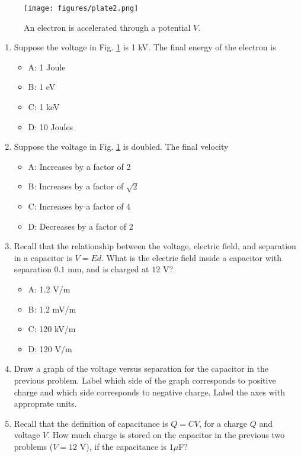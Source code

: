 \documentclass[10pt]{article}
\begin{document}
\begin{enumerate}
\begin{figure}[hb]
\centering
\texttt{[image: figures/plate2.png]}
\caption{\label{fig:plate2} An electron is accelerated through a potential $V$.}
\end{figure}
\begin{enumerate}
\item Suppose the voltage in Fig. \ref{fig:plate2} is 1 kV.  The final energy of the electron is
\begin{itemize}
\item A: 1 Joule
\item B: 1 eV
\item C: 1 keV
\item D: 10 Joules
\end{itemize}
\item Suppose the voltage in Fig. \ref{fig:plate2} is doubled.  The final velocity
\begin{itemize}
\item A: Increases by a factor of 2
\item B: Increases by a factor of $\sqrt{2}$
\item C: Increases by a factor of 4
\item D: Decreases by a factor of 2
\end{itemize}
\item Recall that the relationship between the voltage, electric field, and separation in a capacitor is $V = E d$.  What is the electric field inside a capacitor with separation $0.1$ mm, and is charged at $12$ V?
\begin{itemize}
\item A: 1.2 V/m
\item B: 1.2 mV/m
\item C: 120 kV/m
\item D: 120 V/m
\end{itemize}
\item Draw a graph of the voltage versus separation for the capacitor in the previous problem.  Label which side of the graph corresponds to positive charge and which side corresponds to negative charge.  Label the axes with approprate units. \\ \vspace{3cm}
\item Recall that the definition of capacitance is $Q = CV$, for a charge $Q$ and voltage $V$.  How much charge is stored on the capacitor in the previous two problems ($V = 12$ V), if the capacitance is $1 \mu$F? \\ \vspace{2cm}

\end{enumerate}
\end{enumerate}
\end{document}
